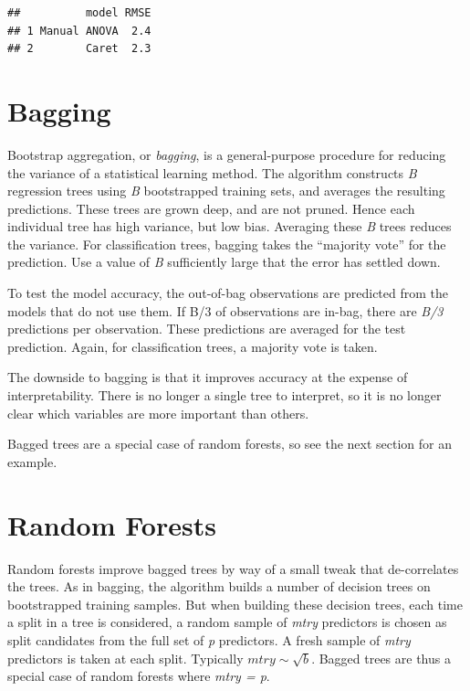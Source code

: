 \documentclass[
]{book}
\begin{document}
\begin{verbatim}
##          model RMSE
## 1 Manual ANOVA  2.4
## 2        Caret  2.3
\end{verbatim}

\hypertarget{bagging}{%
\section{Bagging}\label{bagging}}

Bootstrap aggregation, or \emph{bagging}, is a general-purpose procedure for reducing the variance of a statistical learning method. The algorithm constructs \emph{B} regression trees using \emph{B} bootstrapped training sets, and averages the resulting predictions. These trees are grown deep, and are not pruned. Hence each individual tree has high variance, but low bias. Averaging these \emph{B} trees reduces the variance. For classification trees, bagging takes the ``majority vote'' for the prediction. Use a value of \emph{B} sufficiently large that the error has settled down.

To test the model accuracy, the out-of-bag observations are predicted from the models that do not use them. If B/3 of observations are in-bag, there are \emph{B/3} predictions per observation. These predictions are averaged for the test prediction. Again, for classification trees, a majority vote is taken.

The downside to bagging is that it improves accuracy at the expense of interpretability. There is no longer a single tree to interpret, so it is no longer clear which variables are more important than others.

Bagged trees are a special case of random forests, so see the next section for an example.

\hypertarget{random-forests}{%
\section{Random Forests}\label{random-forests}}

Random forests improve bagged trees by way of a small tweak that de-correlates the trees. As in bagging, the algorithm builds a number of decision trees on bootstrapped training samples. But when building these decision trees, each time a split in a tree is considered, a random sample of \emph{mtry} predictors is chosen as split candidates from the full set of \emph{p} predictors. A fresh sample of \emph{mtry} predictors is taken at each split. Typically \(mtry \sim \sqrt{b}\). Bagged trees are thus a special case of random forests where \emph{mtry = p}.
\end{document}
